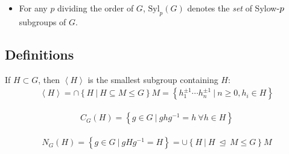 \begin{itemize}
\tightlist
\item
  For any \(p\) dividing the order of \(G\), \(\mathrm{Syl}_p(G)\)
  denotes the \emph{set} of Sylow\({\hbox{-}}p\) subgroups of \(G\).
\end{itemize}

\hypertarget{definitions}{%
\subsection{Definitions}\label{definitions}}

\begin{definition}

If \(H\subset G\), then \(\left\langle{H}\right\rangle\) is the smallest
subgroup containing \(H\):
\begin{align*}
\left\langle{H}\right\rangle = \cap\left\{{H{~\mathrel{\Big|}~}H\subseteq M \leq G}\right\} M = \left\{{ h_1^{\pm 1} \cdots h_n^{\pm 1} {~\mathrel{\Big|}~}n\geq 0, h_i \in H}\right\}
\end{align*}

\end{definition}

\begin{definition}[Centralizer]

\begin{align*}
C_G(H) = \left\{{g\in G {~\mathrel{\Big|}~}ghg^{-1}= h ~\forall h\in H}\right\}
\end{align*}

\end{definition}

\begin{definition}[Normalizer]

\begin{align*}
N_G(H) = \left\{{g\in G {~\mathrel{\Big|}~}gHg^{-1}= H}\right\} = \cup\left\{{H{~\mathrel{\Big|}~}H {~\trianglelefteq~}M \leq G}\right\} M
\end{align*}

\end{definition}

